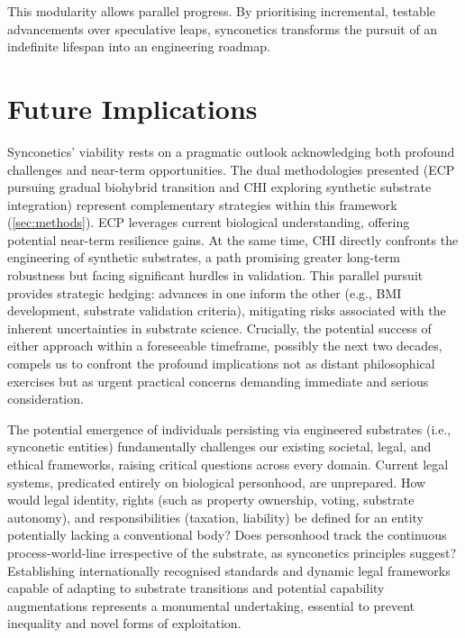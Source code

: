 \documentclass[10pt]{article}
\begin{document}
\begin{sloppypar}
  This modularity allows parallel progress. By prioritising incremental, testable advancements over speculative leaps, synconetics transforms the pursuit of an indefinite lifespan into an engineering roadmap.


  \section{Future Implications}
  \label{sec:implications}

  Synconetics’ viability rests on a pragmatic outlook acknowledging both profound challenges and near-term opportunities. The dual methodologies presented (ECP pursuing gradual biohybrid transition and CHI exploring synthetic substrate integration) represent complementary strategies within this framework (\autoref{sec:methods}). ECP leverages current biological understanding, offering potential near-term resilience gains. At the same time, CHI directly confronts the engineering of synthetic substrates, a path promising greater long-term robustness but facing significant hurdles in validation. This parallel pursuit provides strategic hedging: advances in one inform the other (e.g., BMI development, substrate validation criteria), mitigating risks associated with the inherent uncertainties in substrate science. Crucially, the potential success of either approach within a foreseeable timeframe, possibly the next two decades, compels us to confront the profound implications not as distant philosophical exercises but as urgent practical concerns demanding immediate and serious consideration.

  The potential emergence of individuals persisting via engineered substrates (i.e., synconetic entities) fundamentally challenges our existing societal, legal, and ethical frameworks, raising critical questions across every domain. Current legal systems, predicated entirely on biological personhood, are unprepared. How would legal identity, rights (such as property ownership, voting, substrate autonomy), and responsibilities (taxation, liability) be defined for an entity potentially lacking a conventional body? Does personhood track the continuous process-world-line irrespective of the substrate, as synconetics principles suggest? Establishing internationally recognised standards and dynamic legal frameworks capable of adapting to substrate transitions and potential capability augmentations represents a monumental undertaking, essential to prevent inequality and novel forms of exploitation.


\end{sloppypar}
\end{document}
